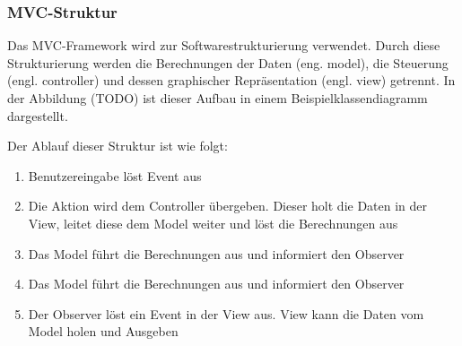 \subsubsection{MVC-Struktur}\label{subsec:mvc}

Das MVC-Framework wird zur Softwarestrukturierung verwendet. Durch diese Strukturierung werden die Berechnungen der Daten (eng. model), die Steuerung (engl. controller) und dessen graphischer Repräsentation (engl. view) getrennt. In der Abbildung (TODO) ist dieser Aufbau in einem Beispielklassendiagramm dargestellt.


Der Ablauf dieser Struktur ist wie folgt: 

\begin{enumerate}
\item Benutzereingabe löst Event aus
\item Die Aktion wird dem Controller übergeben. Dieser holt die Daten in der View, leitet diese dem Model weiter und löst die Berechnungen aus
\item Das Model führt die Berechnungen aus und informiert den Observer
\item Das Model führt die Berechnungen aus und informiert den Observer
\item Der Observer löst ein Event in der View aus. View kann die Daten vom Model holen und Ausgeben
\end{enumerate}

